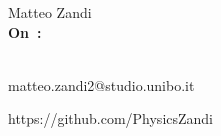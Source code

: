 \pagestyle{empty}
{\raggedleft\vspace*{\baselineskip}
{\LARGE Matteo Zandi}\\[0.35\textheight]
{\HUGE \textcolor{mycolor}{\textbf{On~\thetitle:}}}\\[\baselineskip]
{\LARGE \subt }\\[\baselineskip]
{\large \thedate}\par
\vspace*{2\baselineskip}
\vfill
{\large matteo.zandi2@studio.unibo.it}\par
{\large https://github.com/PhysicsZandi}\par
\vspace*{\baselineskip}}
\clearpage
\pagestyle{headings}

\blankpage
